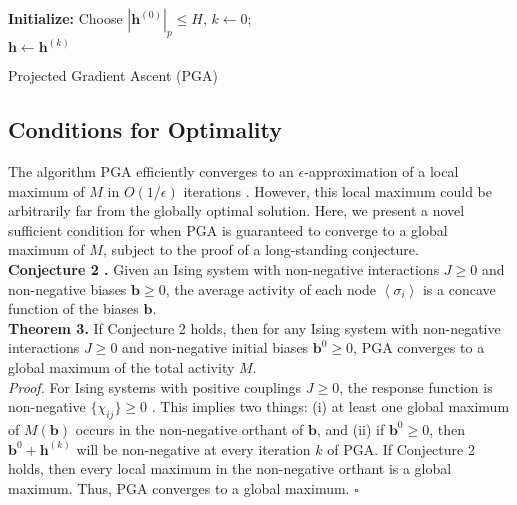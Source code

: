 \documentclass[letterpaper]{article} %
\begin{document}
\begin{algorithm}[t]
\textbf{Initialize:} Choose $|\bm{h}^{(0)}|_p \le H$,  $k\leftarrow 0$; \\
$\bm{h}\leftarrow \bm{h}^{(k)}$\;
\caption{Projected Gradient Ascent (PGA)}
\label{PGA}
\end{algorithm}

\subsection{Conditions for Optimality}

The algorithm PGA efficiently converges to an $\epsilon$-approximation of a local maximum of $M$ in $O(1/\epsilon)$ iterations \cite{Nesterov-01}. However, this local maximum could be arbitrarily far from the globally optimal solution. Here, we present a novel sufficient condition for when PGA is guaranteed to converge to a global maximum of $M$, subject to the proof of a long-standing conjecture.\\ 

\noindent \textbf{Conjecture 2 \cite{Sylvester-01}.} Given an Ising system with non-negative interactions $J\ge 0$ and non-negative biases $\bm{b}\ge0$, the average activity of each node $\left<\sigma_i\right>$ is a concave function of the biases $\bm{b}$. \\

\noindent \textbf{Theorem 3.} If Conjecture 2 holds, then for any Ising system with non-negative interactions $J\ge 0$ and non-negative initial biases $\bm{b}^0\ge 0$, PGA converges to a global maximum of the total activity $M$. \\

\noindent \textit{Proof.} For Ising systems with positive couplings $J\ge 0$, the response function is non-negative $\{\chi_{ij}\} \ge 0$ \cite{Griffiths-03}. This implies two things: (i) at least one global maximum of $M(\bm{b})$ occurs in the non-negative orthant of $\bm{b}$, and (ii) if $\bm{b}^0\ge 0$, then $\bm{b}^0+\bm{h}^{(k)}$ will be non-negative at every iteration $k$ of PGA. If Conjecture 2 holds, then every local maximum in the non-negative orthant is a global maximum. Thus, PGA converges to a global maximum. \hfill $\square$ \\
\end{document}
